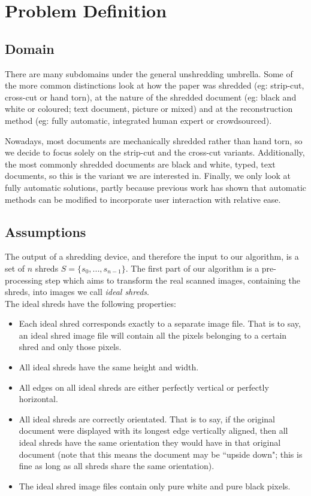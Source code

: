 \chapter{Problem Definition}
\label{chap2}
\section{Domain}
There are many subdomains under the general unshredding umbrella. Some of the more common distinctions look at how the paper was shredded (eg: strip-cut, cross-cut or hand torn), at the nature of the shredded document (eg: black and white or coloured; text document, picture or mixed) and at the reconstruction method (eg: fully automatic, integrated human expert or crowdsourced). 

Nowadays, most documents are mechanically shredded rather than hand torn, so we decide to focus solely on the strip-cut and the cross-cut variants. Additionally, the most commonly shredded documents are black and white, typed, text documents, so this is the variant we are interested in. Finally, we only look at fully automatic solutions, partly because previous work \cite{P1,P2} has shown that automatic methods can be modified to incorporate user interaction with relative ease.
 
\section{Assumptions}
\label{chap2Ass}
The output of a shredding device, and therefore the input to our algorithm, is a set of $n$ shreds $S = \{s_0, ..., s_{n-1}\}$. The first part of our algorithm is a pre-processing step which aims to transform the real scanned images, containing the shreds, into images we call \emph{ideal shreds}. \\
The ideal shreds have the following properties:
\begin{itemize}
\item Each ideal shred corresponds exactly to a separate image file. That is to say, an ideal shred image file will contain all the pixels belonging to a certain shred and only those pixels.
\item All ideal shreds have the same height and width.
\item All edges on all ideal shreds are either perfectly vertical or perfectly horizontal.
\item All ideal shreds are correctly orientated. That is to say, if the original document were displayed with its longest edge vertically aligned, then all ideal shreds have the same orientation they would have in that original document (note that this means the document may be ``upside down"; this is fine as long as all shreds share the same orientation).
\item The ideal shred image files contain only pure white and pure black pixels.
\end{itemize}

